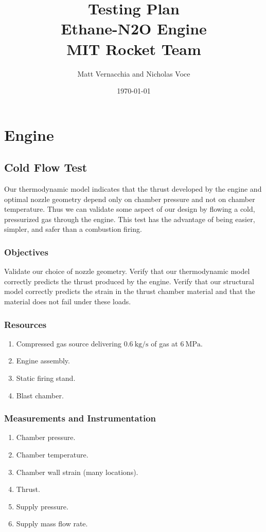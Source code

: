 \documentclass{article}
\title{Testing Plan \\ Ethane-N2O Engine \\ MIT Rocket Team} %
\author{Matt Vernacchia and Nicholas Voce} %
\date{ \today } %
\begin{document}
\maketitle

\section{Engine}
\subsection{Cold Flow Test}
Our thermodynamic model indicates that the thrust developed by the engine and optimal nozzle geometry depend only on chamber pressure and not on chamber temperature. Thus we can validate some aspect of our design by flowing a cold, pressurized gas through the engine. This test has the advantage of being easier, simpler, and safer than a combustion firing.
\subsubsection{Objectives}
Validate our choice of nozzle geometry. Verify that our thermodynamic model correctly predicts the thrust produced by the engine. Verify that our structural model correctly predicts the strain in the thrust chamber material and that the material does not fail under these loads.
\subsubsection{Resources}
\begin{enumerate}
\item Compressed gas source delivering $\SI{0.6}{\kg\per\second}$ of gas at $\SI{6}{\mega\pascal}$.
\item Engine assembly.
\item Static firing stand.
\item Blast chamber.
\end{enumerate}
\subsubsection{Measurements and Instrumentation}
\begin{enumerate}
\item Chamber pressure.
\item Chamber temperature.
\item Chamber wall strain (many locations).
\item Thrust.
\item Supply pressure.
\item Supply mass flow rate.
\end{enumerate}
\end{document}

